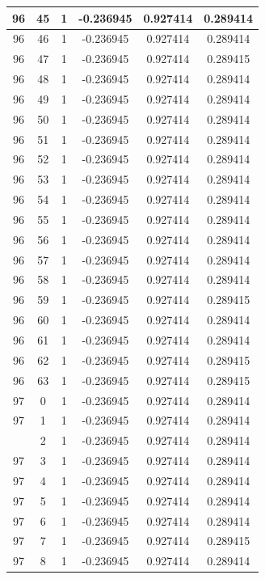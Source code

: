 \documentclass[12pt,a4paper]{article}
\numberwithin{equation}{section}
\numberwithin{figure}{section}
\numberwithin{table}{section}
\begin{document}
\begin{longtable}{|c|c|c|c|c|c|}
96 & 45 & 1 & -0.236945 & 0.927414 & 0.289414 \\ \hline
96 & 46 & 1 & -0.236945 & 0.927414 & 0.289414 \\ \hline
96 & 47 & 1 & -0.236945 & 0.927414 & 0.289415 \\ \hline
96 & 48 & 1 & -0.236945 & 0.927414 & 0.289414 \\ \hline
96 & 49 & 1 & -0.236945 & 0.927414 & 0.289414 \\ \hline
96 & 50 & 1 & -0.236945 & 0.927414 & 0.289414 \\ \hline
96 & 51 & 1 & -0.236945 & 0.927414 & 0.289414 \\ \hline
96 & 52 & 1 & -0.236945 & 0.927414 & 0.289414 \\ \hline
96 & 53 & 1 & -0.236945 & 0.927414 & 0.289414 \\ \hline
96 & 54 & 1 & -0.236945 & 0.927414 & 0.289414 \\ \hline
96 & 55 & 1 & -0.236945 & 0.927414 & 0.289414 \\ \hline
96 & 56 & 1 & -0.236945 & 0.927414 & 0.289414 \\ \hline
96 & 57 & 1 & -0.236945 & 0.927414 & 0.289414 \\ \hline
96 & 58 & 1 & -0.236945 & 0.927414 & 0.289414 \\ \hline
96 & 59 & 1 & -0.236945 & 0.927414 & 0.289415 \\ \hline
96 & 60 & 1 & -0.236945 & 0.927414 & 0.289414 \\ \hline
96 & 61 & 1 & -0.236945 & 0.927414 & 0.289414 \\ \hline
96 & 62 & 1 & -0.236945 & 0.927414 & 0.289415 \\ \hline
96 & 63 & 1 & -0.236945 & 0.927414 & 0.289415 \\ \hline
97 & 0 & 1 & -0.236945 & 0.927414 & 0.289414 \\ \hline
97 & 1 & 1 & -0.236945 & 0.927414 & 0.289414 \\ \hline
\pagebreak
97 & 2 & 1 & -0.236945 & 0.927414 & 0.289414 \\ \hline
97 & 3 & 1 & -0.236945 & 0.927414 & 0.289414 \\ \hline
97 & 4 & 1 & -0.236945 & 0.927414 & 0.289414 \\ \hline
97 & 5 & 1 & -0.236945 & 0.927414 & 0.289414 \\ \hline
97 & 6 & 1 & -0.236945 & 0.927414 & 0.289414 \\ \hline
97 & 7 & 1 & -0.236945 & 0.927414 & 0.289415 \\ \hline
97 & 8 & 1 & -0.236945 & 0.927414 & 0.289414 \\ \hline

\end{longtable}
\end{document}

